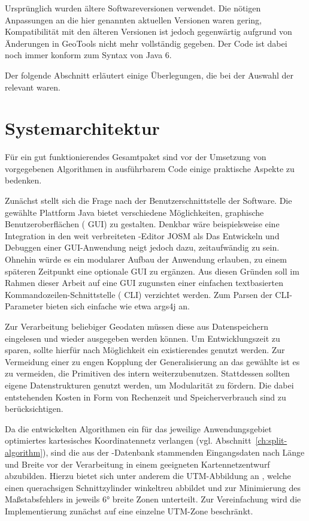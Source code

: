 \documentclass[../main/thesis.tex]{subfiles}
\begin{document}
Ursprünglich wurden ältere Softwareversionen verwendet.
Die nötigen Anpassungen an die hier genannten aktuellen Versionen waren gering, Kompatibilität mit den älteren Versionen ist jedoch gegenwärtig aufgrund von Änderungen in GeoTools nicht mehr vollständig gegeben.
Der Code ist dabei noch immer konform zum Syntax von Java 6. 

Der folgende Abschnitt erläutert einige Überlegungen, die bei der Auswahl der  relevant waren.



\section{Systemarchitektur}
\label{ch:impl-architecture}

Für ein gut funktionierendes Gesamtpaket sind vor der Umsetzung von vorgegebenen Algorithmen in ausführbarem Code einige praktische Aspekte zu bedenken.

Zunächst stellt sich die Frage nach der Benutzerschnittstelle der Software.
Die gewählte Plattform Java bietet verschiedene Möglichkeiten, graphische Benutzeroberflächen ( GUI) zu gestalten.
Denkbar wäre beispielsweise eine Integration in den weit verbreiteten \osm-Editor JOSM als 
Das Entwickeln und Debuggen einer GUI-Anwendung neigt jedoch dazu, zeitaufwändig zu sein.
Ohnehin würde es ein modularer Aufbau der Anwendung erlauben, zu einem späteren Zeitpunkt eine optionale GUI zu ergänzen.
Aus diesen Gründen soll im Rahmen dieser Arbeit auf eine GUI zugunsten einer einfachen textbasierten Kommandozeilen-Schnittstelle ( CLI) verzichtet werden.
Zum Parsen der CLI-Parameter bieten sich einfache  wie etwa args4j an.

Zur Verarbeitung beliebiger Geodaten müssen diese aus Datenspeichern eingelesen und wieder ausgegeben werden können.
Um Entwicklungszeit zu sparen, sollte hierfür nach Möglichkeit ein existierendes  genutzt werden.
Zur Vermeidung einer zu engen Kopplung der Generalisierung an das gewählte  ist es zu vermeiden, die Primitiven des  intern weiterzubenutzen.
Stattdessen sollten eigene Datenstrukturen genutzt werden, um Modularität zu fördern.
Die dabei entstehenden Kosten in Form von Rechenzeit und Speicherverbrauch sind zu berücksichtigen.

Da die entwickelten Algorithmen ein für das jeweilige Anwendungsgebiet optimiertes kartesisches Koordinatennetz verlangen (vgl. Abschnitt~\ref{ch:split-algorithm}), sind die aus der \osm-Datenbank stammenden Eingangsdaten nach Länge und Breite vor der Verarbeitung in einem geeigneten Kartennetzentwurf abzubilden.
Hierzu bietet sich unter anderem die UTM-Abbildung an , welche einen querachsigen Schnittzylinder winkeltreu abbildet und zur Minimierung des Maßstabsfehlers in jeweils 6° breite Zonen unterteilt. 
Zur Vereinfachung wird die Implementierung zunächst auf eine einzelne UTM-Zone beschränkt.
\end{document}
